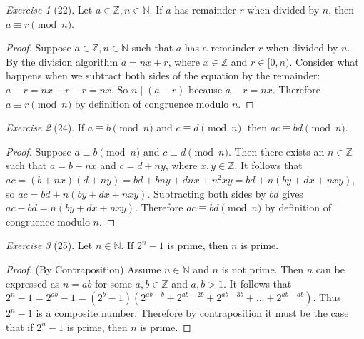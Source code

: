 \documentclass[12pt]{amsart}
\theoremstyle{remark}
\newtheorem*{exercise}{Exercise}%
\def\NN{\ensuremath{\mathbb N}}
\def\ZZ{\ensuremath{\mathbb Z}}
\theoremstyle{mycomment}
\begin{document}
\begin{exercise}[22] Let $a\in\ZZ, n\in\NN$. If $a$ has remainder $r$ when divided by $n$, then $a\equiv r\pmod n$.
\begin{proof}
	Suppose $a\in\ZZ, n\in\NN$ such that $a$ has a remainder $r$ when divided by $n$. By the division algorithm $a = nx + r$, where $x \in \ZZ$ and $r \in [ 0,n )$. Consider what happens when we subtract both sides of the equation by the remainder: $a - r = nx + r - r = nx$. So $n \mid (a - r)$ because $a - r = nx$. Therefore $a \equiv r \pmod{n}$ by definition of congruence modulo $n$.
\end{proof}
\end{exercise}

\begin{exercise}[24] If $a\equiv b\pmod n$ and $c\equiv d\pmod n$, then $ac\equiv bd\pmod n$. 
\begin{proof}
	Suppose $a \equiv b\pmod n$ and $c \equiv d\pmod n$. Then there exists an $n \in \ZZ$ such that $a = b + nx$ and $c = d + ny$, where $x,y\in\ZZ$. It follows that $ac = (b+nx)(d + ny) = bd + bny +dnx + n^2xy = bd + n(by + dx + nxy)$, so $ac = bd + n(by + dx + nxy)$. Subtracting both sides by $bd$ gives $ac - bd = n(by + dx + nxy)$. Therefore $ac \equiv bd \pmod{n}$ by definition of congruence modulo $n$.
\end{proof}
\end{exercise}


\begin{exercise}[25] Let $n\in\NN$. If $2^{n}-1$ is prime, then $n$ is prime.
\begin{proof}
	(By Contraposition) Assume $n\in\NN$ and $n$ is not prime. Then $n$ can be expressed as $n = ab$ for some $a,b\in\ZZ$ and $a,b > 1$. It follows that  $2^n - 1 = 2^{ab} - 1 =  (2^b - 1)(2^{ab-b} + 2^{ab-2b} + 2^{ab -3b} + ... + 2^{ab - ab})$. Thus $2^n - 1$ is a composite number. Therefore by contraposition it must be the case that if $2^{n} - 1$ is prime, then $n$ is prime.  
\end{proof}
\end{exercise}
\end{document}
